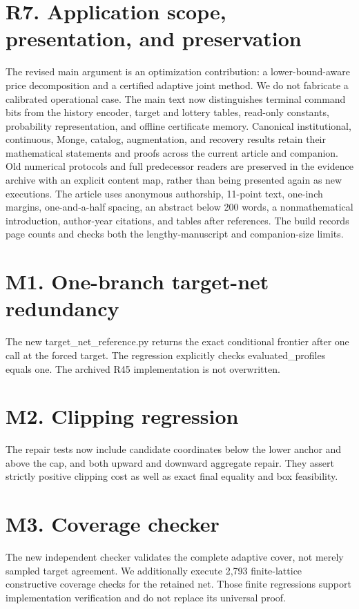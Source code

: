 \documentclass[11pt,letterpaper]{article}
\begin{document}
\section*{R7. Application scope, presentation, and preservation}
The revised main argument is an optimization contribution: a lower-bound-aware price decomposition and a certified adaptive joint method. We do not fabricate a calibrated operational case. The main text now distinguishes terminal command bits from the history encoder, target and lottery tables, read-only constants, probability representation, and offline certificate memory. Canonical institutional, continuous, Monge, catalog, augmentation, and recovery results retain their mathematical statements and proofs across the current article and companion. Old numerical protocols and full predecessor readers are preserved in the evidence archive with an explicit content map, rather than being presented again as new executions. The article uses anonymous authorship, 11-point text, one-inch margins, one-and-a-half spacing, an abstract below 200 words, a nonmathematical introduction, author-year citations, and tables after references. The build records page counts and checks both the lengthy-manuscript and companion-size limits.

\section*{M1. One-branch target-net redundancy}
The new target\_net\_reference.py returns the exact conditional frontier after one call at the forced target. The regression explicitly checks evaluated\_profiles equals one. The archived R45 implementation is not overwritten.

\section*{M2. Clipping regression}
The repair tests now include candidate coordinates below the lower anchor and above the cap, and both upward and downward aggregate repair. They assert strictly positive clipping cost as well as exact final equality and box feasibility.

\section*{M3. Coverage checker}
The new independent checker validates the complete adaptive cover, not merely sampled target agreement. We additionally execute 2,793 finite-lattice constructive coverage checks for the retained net. Those finite regressions support implementation verification and do not replace its universal proof.
\end{document}
